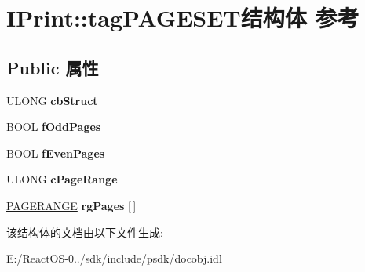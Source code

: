 \hypertarget{struct_i_print_1_1tag_p_a_g_e_s_e_t}{}\section{I\+Print\+:\+:tag\+P\+A\+G\+E\+S\+E\+T结构体 参考}
\label{struct_i_print_1_1tag_p_a_g_e_s_e_t}
\subsection*{Public 属性}
\begin{DoxyCompactItemize}
\item 
\mbox{\label{struct_i_print_1_1tag_p_a_g_e_s_e_t_a28685f261f18b8df5e1efe00782dc4d9}} 
U\+L\+O\+NG {\bfseries cb\+Struct}
\item 
\mbox{\label{struct_i_print_1_1tag_p_a_g_e_s_e_t_a9f6c3153dfd5693b034ae2e87f8e15ce}} 
B\+O\+OL {\bfseries f\+Odd\+Pages}
\item 
\mbox{\label{struct_i_print_1_1tag_p_a_g_e_s_e_t_a27e6118e4f5710c7c0844cc54cb5ebdf}} 
B\+O\+OL {\bfseries f\+Even\+Pages}
\item 
\mbox{\label{struct_i_print_1_1tag_p_a_g_e_s_e_t_a3dba80956fbab96d2c80c73308f818f3}} 
U\+L\+O\+NG {\bfseries c\+Page\+Range}
\item 
\mbox{\label{struct_i_print_1_1tag_p_a_g_e_s_e_t_a166d30452a80b154aea6dabd21a2e062}} 
\hyperlink{struct_i_print_1_1tag_p_a_g_e_r_a_n_g_e}{P\+A\+G\+E\+R\+A\+N\+GE} {\bfseries rg\+Pages} \mbox{[}$\,$\mbox{]}
\end{DoxyCompactItemize}


该结构体的文档由以下文件生成\+:\begin{DoxyCompactItemize}
\item 
E\+:/\+React\+O\+S-\/0../sdk/include/psdk/docobj.\+idl\end{DoxyCompactItemize}
